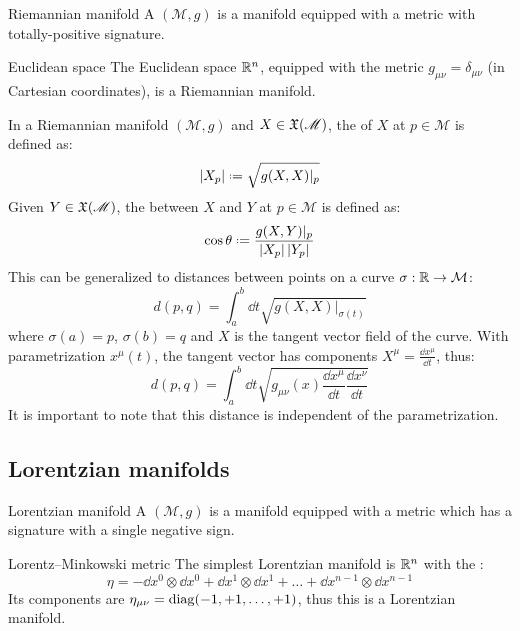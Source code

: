\begin{definition}{Riemannian manifold}{}
  A  $ (\mathcal{M},g) $ is a manifold equipped with a metric with totally-positive signature.
\end{definition}

\begin{example}{Euclidean space}{}
  The Euclidean space $ \mathbb{R}^n $, equipped with the metric $ g_{\mu \nu} = \delta_{\mu \nu} $ (in Cartesian coordinates), is a Riemannian manifold.
\end{example}

In a Riemannian manifold $ (\mathcal{M},g) $ and $ X \in \mathfrak{X}(\mathscr{M}) $, the  of $ X $ at $ p \in \mathcal{M} $ is defined as:
\begin{equation}
  \abs{X_p} \defeq \sqrt{g(X,X)\vert_p}
\end{equation}
Given $ Y \in \mathfrak{X}(\mathscr{M}) $, the  between $ X $ and $ Y $ at $ p \in \mathcal{M} $ is defined as:
\begin{equation}
  \cos \theta \defeq \frac{g(X,Y) \vert_p}{\abs{X_p} \abs{Y_p}}
\end{equation}
This can be generalized to distances between points on a curve $ \sigma : \mathcal{\mathbb{R}} \rightarrow \mathcal{M} $:
\begin{equation}
  d(p,q) = \int_a^b \dd t \sqrt{g(X,X)\vert_{\sigma(t)}}
  \label{eq:distance}
\end{equation}
where $ \sigma(a) = p $, $ \sigma(b) = q $ and $ X $ is the tangent vector field of the curve. With parametrization $ x^{\mu}(t) $, the tangent vector has components $ X^{\mu} = \frac{\dd x^{\mu}}{\dd t} $, thus:
\begin{equation}
  d(p,q) = \int_a^b \dd t \sqrt{g_{\mu \nu}(x) \frac{\dd x^{\mu}}{\dd t} \frac{\dd x^{\nu}}{\dd t}}
\end{equation}
It is important to note that this distance is independent of the parametrization.

\subsection{Lorentzian manifolds}

\begin{definition}{Lorentzian manifold}{}
  A  $ (\mathcal{M},g) $ is a manifold equipped with a metric which has a signature with a single negative sign.
\end{definition}

\begin{example}{Lorentz--Minkowski metric}{}
  The simplest Lorentzian manifold is $ \mathbb{R}^n $ with the :
  \begin{equation}
    \eta = - \dd x^0 \otimes \dd x^0 + \dd x^1 \otimes \dd x^1 + \dots + \dd x^{n-1} \otimes \dd x^{n-1}
  \end{equation}
  Its components are $ \eta_{\mu \nu} = \operatorname{diag} (-1,+1,\dots,+1) $, thus this is a Lorentzian manifold.
\end{example}

